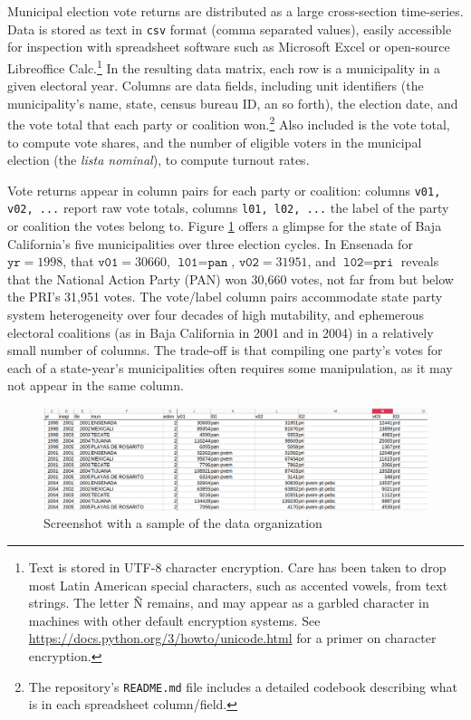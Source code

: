 \documentclass[letter,12pt]{article}
\begin{document}
Municipal election vote returns are distributed as a large cross-section time-series. Data is stored as text in \verb|csv| format (comma separated values), easily accessible for inspection with spreadsheet software such as Microsoft Excel or open-source Libreoffice Calc.\footnote{Text is stored in UTF-8 character encryption. Care has been taken to drop most Latin American special characters, such as accented vowels, from text strings. The letter \~N remains, and may appear as a garbled character in machines with other default encryption systems. See \url{https://docs.python.org/3/howto/unicode.html} for a primer on character encryption.} In the resulting data matrix, each row is a municipality in a given electoral year. Columns are data fields, including unit identifiers (the municipality's name, state, census bureau ID, an so forth), the election date, and the vote total that each party or coalition won.\footnote{The repository's \verb|README.md| file includes a detailed codebook describing what is in each spreadsheet column/field.} Also included is the vote total, to compute vote shares, and the number of eligible voters in the municipal election (the \emph{lista nominal}), to compute turnout rates.  

Vote returns appear in column pairs for each party or coalition: columns \verb|v01, v02, ...| report raw vote totals, columns \verb|l01, l02, ...| the label of the party or coalition the votes belong to. Figure \ref{F:scrn} offers a glimpse for the state of Baja California's five municipalities over three election cycles. In Ensenada for $\texttt{yr} = 1998$, that $\texttt{v01} = 30660$, $\texttt{l01} = \texttt{pan}$, $\texttt{v02} = 31951$, and $\texttt{l02} = \texttt{pri}$ reveals that the National Action Party (PAN) won 30,660 votes, not far from but below the PRI's 31,951 votes. The vote/label column pairs accommodate state party system heterogeneity over four decades of high mutability, and ephemerous electoral coalitions (as in Baja California in 2001 and in 2004) in a relatively small number of columns. The trade-off is that compiling one party's votes for each of a state-year's municipalities often requires some manipulation, as it may not appear in the same column. 

\begin{figure}
  \centering
  \includegraphics[width=\columnwidth]{pics/eg-spreadsheet-columns.png}
  \caption{Screenshot with a sample of the data organization}\label{F:scrn}
\end{figure}  
\end{document}
